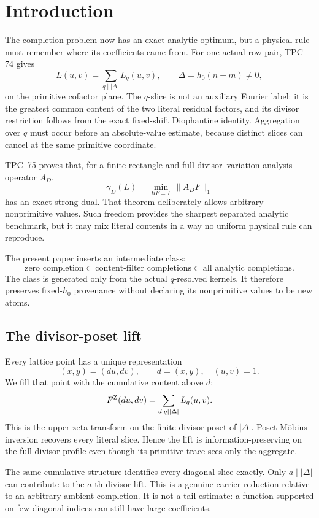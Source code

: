 \section{Introduction}
\label{sec:introduction}

The completion problem now has an exact analytic optimum, but a physical
rule must remember where its coefficients came from.  For one actual
row pair, TPC--74 \citep{WangTPC74} gives
\[
 L(u,v)=\sum_{q\mid|\Delta|}L_q(u,v),
 \qquad
 \Delta=h_0(n-m)\ne0,
\]
on the primitive cofactor plane.  The \(q\)-slice is not an auxiliary
Fourier label: it is the greatest common content of the two literal
residual factors, and its divisor restriction follows from the exact
fixed-shift Diophantine identity.  Aggregation over \(q\) must occur
before an absolute-value estimate, because distinct slices can cancel at
the same primitive coordinate.

TPC--75 \citep{WangTPC75} proves that, for a finite rectangle and full
divisor--variation analysis operator \(A_D\),
\[
 \gamma_D(L)
 =
 \min_{RF=L}\|A_DF\|_1
\]
has an exact strong dual.  That theorem deliberately allows arbitrary
nonprimitive values.  Such freedom provides the sharpest separated
analytic benchmark, but it may mix literal contents in a way no uniform
physical rule can reproduce.

The present paper inserts an intermediate class:
\[
 \text{zero completion}
 \subset
 \text{content-filter completions}
 \subset
 \text{all analytic completions}.
\]
The class is generated only from the actual \(q\)-resolved kernels.  It
therefore preserves fixed-\(h_0\) provenance without declaring its
nonprimitive values to be new atoms.

\subsection{The divisor-poset lift}

Every lattice point has a unique representation
\[
 (x,y)=(du,dv),
 \qquad d=(x,y),\quad(u,v)=1.
\]
We fill that point with the cumulative content above \(d\):
\[
 F^{\rm Z}(du,dv)
 =
 \sum_{d\mid q\mid|\Delta|}L_q(u,v).
\]
This is the upper zeta transform on the finite divisor poset of
\(|\Delta|\).  Poset M\"obius inversion \citep{Rota1964} recovers every
literal slice.  Hence the lift is information-preserving on the full
divisor profile even though its primitive trace sees only the aggregate.

The same cumulative structure identifies every diagonal slice exactly.
Only \(a\mid|\Delta|\) can contribute to the \(a\)-th divisor lift.
This is a genuine carrier reduction relative to an arbitrary ambient
completion.  It is not a tail estimate: a function supported on few
diagonal indices can still have large coefficients.

